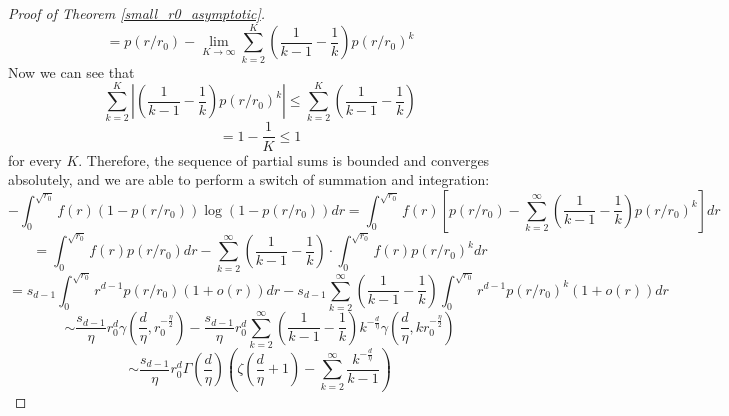 \documentclass{article}
\newcommand{\tti}{\rightarrow\infty}
\begin{document}
\begin{proof}[Proof of Theorem \ref{small_r0_asymptotic}]
\begin{equation}
        \end{equation}
        \begin{equation}
            = p(r/r_0) - \lim_{K \tti} \sum_{k=2}^{K}\left(\frac{1}{k-1}-\frac{1}{k}\right)p(r/r_0)^k
        \end{equation}
        Now we can see that
        \begin{equation}
            \sum_{k=2}^K\left|\left(\frac{1}{k-1}-\frac{1}{k}\right)p(r/r_0)^k\right| \leq \sum_{k=2}^K\left(\frac{1}{k-1}-\frac{1}{k}\right)
        \end{equation}
        \begin{equation}
            = 1 - \frac{1}{K} \leq 1
        \end{equation}
        for every $K$. Therefore, the sequence of partial sums is bounded and converges absolutely, and we are able to perform a switch of summation and integration:
        \begin{equation}
            -\int_0^{\sqrt{r_0}} f(r)(1-p(r/r_0))\log (1-p(r/r_0)) dr = \int_0^{\sqrt{r_0}} f(r)\left[p(r/r_0) - \sum_{k=2}^{\infty}\left(\frac{1}{k-1}-\frac{1}{k}\right)p(r/r_0)^k\right]dr
        \end{equation}
        \begin{equation}
            = \int_0^{\sqrt{r_0}} f(r)p(r/r_0)dr - \sum_{k=2}^{\infty}\left(\frac{1}{k-1}-\frac{1}{k}\right)\cdot \int_0^{\sqrt{r_0}} f(r)p(r/r_0)^kdr
        \end{equation}
        \begin{equation}
            \label{eq:o(r)_is_here}
            = s_{d-1}\int_0^{\sqrt{r_0}} r^{d-1} p(r/r_0) ( 1+ o(r))dr - s_{d-1}\sum_{k=2}^{\infty} \left(\frac{1}{k-1}-\frac{1}{k}\right)\int_0^{\sqrt{r_0}}r^{d-1}p(r/r_0)^k(1+o(r))dr
        \end{equation}
        \begin{equation}
            \label{penultimate}
            \sim \frac{s_{d-1}}{\eta}r_0^d \gamma\left(\frac{d}{\eta}, r_0^{-\frac{\eta}{2}}\right) - \frac{s_{d-1}}{\eta}r_0^d \sum_{k=2}^{\infty}\left(\frac{1}{k-1}-\frac{1}{k}\right)k^{-\frac{d}{\eta}}\gamma\left(\frac{d}{\eta}, kr_0^{-\frac{\eta}{2}}\right)
        \end{equation}
        \begin{equation}
            \label{final_line}
           \sim \frac{s_{d-1}}{\eta}r_0^d \Gamma\left(\frac{d}{\eta}\right)\left(\zeta\left(\frac{d}{\eta}+1\right) -\sum_{k=2}^{\infty}\frac{k^{-\frac{d}\eta}}{k-1}\right)
        \end{equation}

\end{proof}
\end{document}
